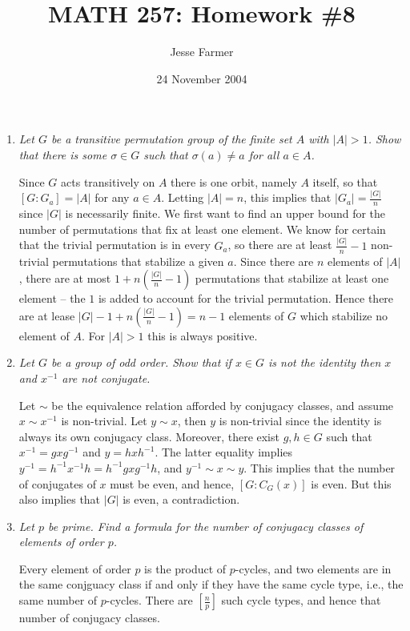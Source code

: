 \documentclass[letterpaper, 11pt]{article}
\title{MATH 257: Homework \#8}
\author{Jesse Farmer}
\date{24 November 2004}
\begin{document}
\maketitle
\begin{enumerate}

\item \emph{Let $G$ be a transitive permutation group of the finite set $A$ with $|A| > 1$.  Show that there is some $\sigma \in G$ such that $\sigma(a) \neq a$ for all $a \in A$.}

Since $G$ acts transitively on $A$ there is one orbit, namely $A$ itself, so that $[G : G_a] = |A|$ for any $a \in A$.  Letting $|A| = n$, this implies that $|G_a| = \frac{|G|}{n}$ since $|G|$ is necessarily finite.  We first want to find an upper bound for the number of permutations that fix at least one element.  We know for certain that the trivial permutation is in every $G_a$, so there are at least $\frac{|G|}{n} - 1$ non-trivial permutations that stabilize a given $a$.  Since there are $n$ elements of $|A|$, there are at most $1 + n\left(\frac{|G|}{n} - 1\right)$ permutations that stabilize at least one element -- the $1$ is added to account for the trivial permutation.  Hence there are at lease $|G| - 1 + n\left(\frac{|G|}{n} - 1\right) = n-1$ elements of $G$ which stabilize no element of $A$.  For $|A| > 1$ this is always positive.

\item \emph{Let $G$ be a group of odd order.  Show that if $x \in G$ is not the identity then $x$ and $x^{-1}$ are not conjugate.}

Let $\sim$ be the equivalence relation afforded by conjugacy classes, and assume $x \sim x^{-1}$ is non-trivial.  Let $y \sim x$, then $y$ is non-trivial since the identity is always its own conjugacy class.  Moreover, there exist $g,h \in G$ such that $x^{-1} = gxg^{-1}$ and $y = hxh^{-1}$.  The latter equality implies $y^{-1} = h^{-1}x^{-1}h = h^{-1}gxg^{-1}h$, and $y^{-1} \sim x \sim y$.  This implies that the number of conjugates of $x$ must be even, and hence, $[G:C_G(x)]$ is even.  But this also implies that $|G|$ is even, a contradiction.

\item \emph{Let $p$ be prime.  Find a formula for the number of conjugacy classes of elements of order $p$.}

Every element of order $p$ is the product of $p$-cycles, and two elements are in the same conjguacy class if and only if they have the same cycle type, i.e., the same number of $p$-cycles.  There are $\left[\frac{n}{p}\right]$ such cycle types, and hence that number of conjugacy classes.


\end{enumerate}
\end{document}
